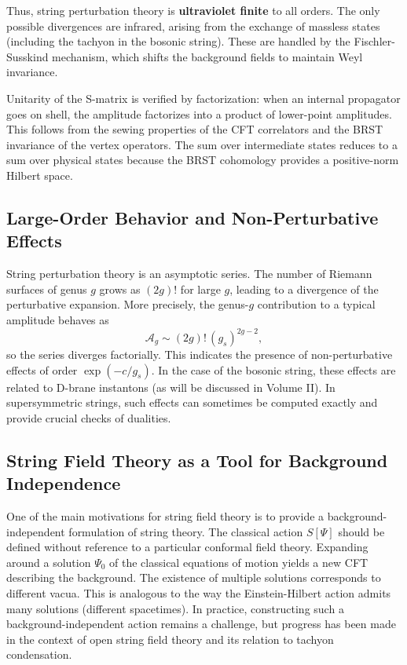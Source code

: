 \documentclass[11pt]{article}
\begin{document}
Thus, string perturbation theory is \textbf{ultraviolet finite} to all orders. The only possible divergences are infrared, arising from the exchange of massless states (including the tachyon in the bosonic string). These are handled by the Fischler-Susskind mechanism, which shifts the background fields to maintain Weyl invariance.

Unitarity of the S-matrix is verified by factorization: when an internal propagator goes on shell, the amplitude factorizes into a product of lower-point amplitudes. This follows from the sewing properties of the CFT correlators and the BRST invariance of the vertex operators. The sum over intermediate states reduces to a sum over physical states because the BRST cohomology provides a positive-norm Hilbert space.

\subsection{Large-Order Behavior and Non-Perturbative Effects}

String perturbation theory is an asymptotic series. The number of Riemann surfaces of genus $g$ grows as $(2g)!$ for large $g$, leading to a divergence of the perturbative expansion. More precisely, the genus-$g$ contribution to a typical amplitude behaves as
\begin{equation}
\mathcal{A}_g \sim (2g)! \, (g_s)^{2g-2},
\end{equation}
so the series diverges factorially. This indicates the presence of non-perturbative effects of order $\exp(-c/g_s)$. In the case of the bosonic string, these effects are related to D-brane instantons (as will be discussed in Volume II). In supersymmetric strings, such effects can sometimes be computed exactly and provide crucial checks of dualities.

\subsection{String Field Theory as a Tool for Background Independence}

One of the main motivations for string field theory is to provide a background-independent formulation of string theory. The classical action $S[\Psi]$ should be defined without reference to a particular conformal field theory. Expanding around a solution $\Psi_0$ of the classical equations of motion yields a new CFT describing the background. The existence of multiple solutions corresponds to different vacua. This is analogous to the way the Einstein-Hilbert action admits many solutions (different spacetimes). In practice, constructing such a background-independent action remains a challenge, but progress has been made in the context of open string field theory and its relation to tachyon condensation.
\end{document}
